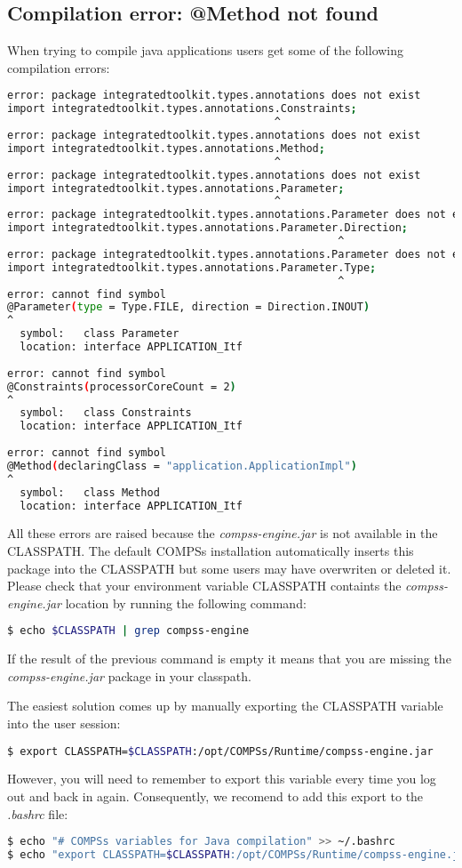 \subsection{Compilation error: @Method not found}
When trying to compile java applications users get some of the following compilation errors:
\begin{lstlisting}[language=bash]
error: package integratedtoolkit.types.annotations does not exist
import integratedtoolkit.types.annotations.Constraints;
                                          ^
error: package integratedtoolkit.types.annotations does not exist
import integratedtoolkit.types.annotations.Method;
                                          ^
error: package integratedtoolkit.types.annotations does not exist
import integratedtoolkit.types.annotations.Parameter;
                                          ^
error: package integratedtoolkit.types.annotations.Parameter does not exist
import integratedtoolkit.types.annotations.Parameter.Direction;
                                                    ^
error: package integratedtoolkit.types.annotations.Parameter does not exist
import integratedtoolkit.types.annotations.Parameter.Type;
                                                    ^
error: cannot find symbol
@Parameter(type = Type.FILE, direction = Direction.INOUT)
^
  symbol:   class Parameter
  location: interface APPLICATION_Itf
  
error: cannot find symbol
@Constraints(processorCoreCount = 2)
^
  symbol:   class Constraints
  location: interface APPLICATION_Itf
  
error: cannot find symbol
@Method(declaringClass = "application.ApplicationImpl")
^
  symbol:   class Method
  location: interface APPLICATION_Itf
\end{lstlisting}

All these errors are raised because the \textit{compss-engine.jar} is not available in the CLASSPATH. The default COMPSs installation
automatically inserts this package into the CLASSPATH but some users may have overwriten or deleted it. Please check that your 
environment variable CLASSPATH containts the \textit{compss-engine.jar} location by running the following command:
\begin{lstlisting}[language=bash]
$ echo $CLASSPATH | grep compss-engine
\end{lstlisting}
If the result of the previous command is empty it means that you are missing the \textit{compss-engine.jar} package in your classpath. 

The easiest solution comes up by manually exporting the CLASSPATH variable into the user session:
\begin{lstlisting}[language=bash]
$ export CLASSPATH=$CLASSPATH:/opt/COMPSs/Runtime/compss-engine.jar
\end{lstlisting}
However, you will need to remember to export this variable every time you log out and back in again. Consequently, we recomend to 
add this export to the \textit{.bashrc} file:
\begin{lstlisting}[language=bash]
$ echo "# COMPSs variables for Java compilation" >> ~/.bashrc
$ echo "export CLASSPATH=$CLASSPATH:/opt/COMPSs/Runtime/compss-engine.jar" >> ~/.bashrc
\end{lstlisting}

